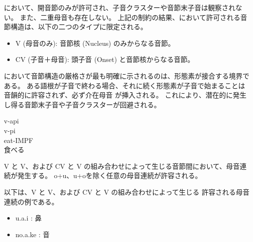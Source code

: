\langname において、開音節のみが許可され、子音クラスターや音節末子音は観察されない。
また、二重母音も存在しない。
上記の制約の結果、\langname において許可される音節構造は、以下の二つのタイプに限定される。

\begin{itemize}
    \item {V (母音のみ)}: 音節核 (Nucleus) のみからなる音節。
    \item {CV (子音＋母音)}: 頭子音 (Onset) と音節核からなる音節。
\end{itemize}

\langname において音節構造の厳格さが最も明確に示されるのは、形態素が接合する境界である。
ある語根が子音で終わる場合、それに続く形態素が子音で始まることは音韻的に許容されず、必ず介在母音
が挿入される。
これにより、潜在的に発生し得る音節末子音や子音クラスターが回避される。

\begin{exe}
    \ex \glll v-api \\
    v-pi \\
    eat-IMPF \\
        \glt 食べる
\end{exe}

{V} と {V}、および {CV} と {V} の組み合わせによって生じる音節間において、母音連続が発生する。
o+u、u+oを除く任意の母音連続が許容される。

以下は、{V} と {V}、および {CV} と {V} の組み合わせによって生じる
許容される母音連続の例である。

\begin{itemize}
    \item u.a.i : 鼻 %
    \item no.a.ke : 音
\end{itemize}

